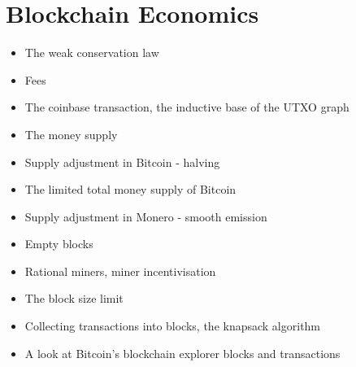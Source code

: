 \chapter{Blockchain Economics}

{\color{red}
\begin{itemize}
\item The weak conservation law
\item Fees
\item The coinbase transaction, the inductive base of the UTXO graph
\item The money supply
\item Supply adjustment in Bitcoin - halving
\item The limited total money supply of Bitcoin
\item Supply adjustment in Monero - smooth emission
\item Empty blocks
\item Rational miners, miner incentivisation
\item The block size limit
\item Collecting transactions into blocks, the knapsack algorithm
\item A look at Bitcoin's blockchain explorer blocks and transactions
\end{itemize}
}
